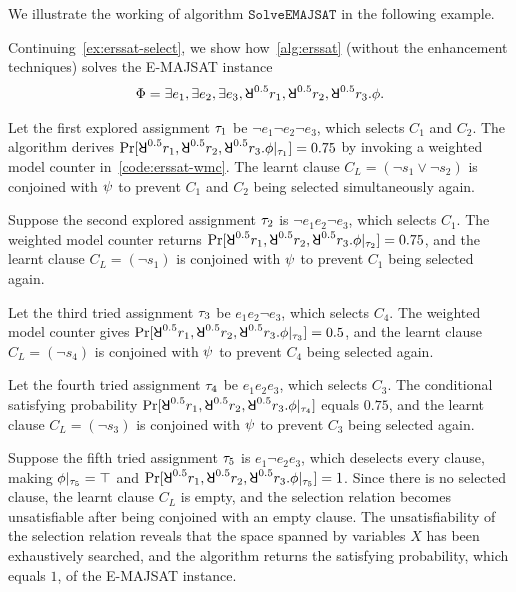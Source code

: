 We illustrate the working of algorithm $\mathtt{SolveEMAJSAT}$ in the following example.
\begin{example}\label{ex:erssat-basic}
    Continuing~\cref{ex:erssat-select},
    we show how~\cref{alg:erssat} (without the enhancement techniques) solves the E-MAJSAT instance
    \begin{align*}
        \Qf=\exists e_1,\exists e_2,\exists e_3,\random{0.5} r_1,\random{0.5} r_2,\random{0.5} r_3.\pf.
    \end{align*}

    Let the first explored assignment $\tau_1$ be $\lnot e_1 \lnot e_2 \lnot e_3$,
    which selects $C_1$ and $C_2$.
    The algorithm derives $\spb{\random{0.5} r_1,\random{0.5} r_2,\random{0.5} r_3.\pcf{\pf}{\as_1}}=0.75$ by invoking a weighted model counter in~\cref{code:erssat-wmc}.
    The learnt clause $C_L=(\lnot s_1 \lor \lnot s_2)$ is conjoined with $\psi$ to prevent $C_1$ and $C_2$ being selected simultaneously again.

    Suppose the second explored assignment $\tau_2$ is $\lnot e_1 e_2 \lnot e_3$,
    which selects $C_1$.
    The weighted model counter returns $\spb{\random{0.5} r_1,\random{0.5} r_2,\random{0.5} r_3.\pcf{\pf}{\as_2}}=0.75$,
    and the learnt clause $C_L=(\lnot s_1)$ is conjoined with $\psi$ to prevent $C_1$ being selected again.

    Let the third tried assignment $\tau_3$ be $e_1 e_2 \lnot e_3$,
    which selects $C_4$.
    The weighted model counter gives $\spb{\random{0.5} r_1,\random{0.5} r_2,\random{0.5} r_3.\pcf{\pf}{\as_3}}=0.5$,
    and the learnt clause $C_L=(\lnot s_4)$ is conjoined with $\psi$ to prevent $C_4$ being selected again.

    Let the fourth tried assignment $\tau_4$ be $e_1 e_2 e_3$,
    which selects $C_3$.
    The conditional satisfying probability $\spb{\random{0.5} r_1,\random{0.5} r_2,\random{0.5} r_3.\pcf{\pf}{\as_4}}$ equals $0.75$,
    and the learnt clause $C_L=(\lnot s_3)$ is conjoined with $\psi$ to prevent $C_3$ being selected again.

    Suppose the fifth tried assignment $\tau_5$ is $e_1 \lnot e_2 e_3$,
    which deselects every clause, making $\phi|_{\tau_5}=\top$ and
    $\spb{\random{0.5} r_1,\random{0.5} r_2,\random{0.5} r_3.\pcf{\pf}{\as_5}}=1$.
    Since there is no selected clause,
    the learnt clause $C_L$ is empty,
    and the selection relation becomes unsatisfiable after being conjoined with an empty clause.
    The unsatisfiability of the selection relation reveals that the space spanned by variables $X$ has been exhaustively searched,
    and the algorithm returns the satisfying probability, which equals $1$, of the E-MAJSAT instance.
\end{example}

